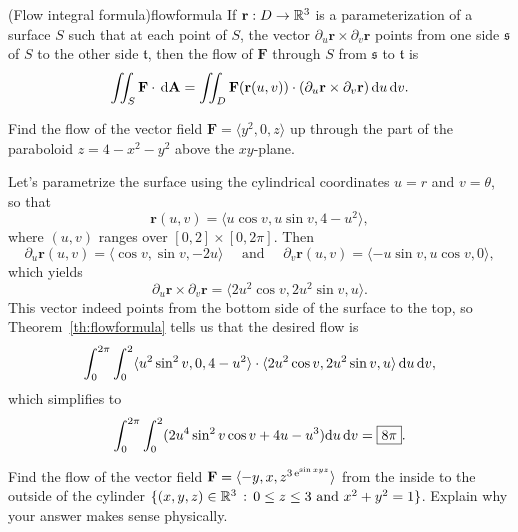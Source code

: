 \documentclass{watsonbook}
\begin{document}
\begin{theo}{(Flow integral formula)}{flowformula}
  If $\mathbf{r}:D \to \mathbb{R}^3$ is a parameterization of a surface $S$
  such that at each point of $S$, the vector
  $\partial_u \mathbf{r} \times \partial_v \mathbf{r}$ points from one
  side $\mathfrak{s}$ of $S$ to the other side $\mathfrak{t}$, then
  the flow of $\mathbf{F}$ through $S$ from $\mathfrak{s}$ to $\mathfrak{t}$ is 
  \begin{equation} \label{eq:surfformula} 
    \iint_S \mathbf{F}\cdot \, {\mathrm{d}}\mathbf{A} = \iint_D
    \mathbf{F}(\mathbf{r}(u,v)) \cdot (\partial_u
    \mathbf{r} \times \partial_v \mathbf{r}) \, {\mathrm{d}}u\,{\mathrm{d}}v. 
  \end{equation}
\end{theo}

\begin{example}{}{}
  Find the flow of the vector field $\mathbf{F} = \langle y^2, 0, z
  \rangle$ up through the part of the paraboloid $z = 4 - x^2 - y^2$
  above the $xy$-plane. 
\end{example}

\begin{solution}
  Let's parametrize the surface using the cylindrical coordinates $u=r$
  and $v=\theta$, so that
  \[
    \mathbf{r}(u,v) = \langle u\cos v, u \sin v, 4 - u^2 \rangle, 
  \]
  where $(u,v)$ ranges over $[0,2] \times [0,2\pi]$. Then 
  \[
    \partial_u \mathbf{r}(u,v) = \langle \cos v, \sin v, -2u \rangle \quad \text{ and } \quad
    \partial_v \mathbf{r}(u,v) = \langle -u\sin v, u \cos v, 0
    \rangle, 
  \]
  which yields 
  \[
    \partial_u\mathbf{r} \times \partial_v \mathbf{r} = \langle 2 u^{2} \cos v,2 u^{2} \sin v, u \rangle. 
  \]
  This vector indeed points from the bottom side of the surface to the
  top, so Theorem~\ref{th:flowformula} tells us that the desired flow
  is 
  \[
    \int_{0}^{2\pi}\int_{0}^{2} \langle u^2 \sin^2 v, 0, 4-u^2
    \rangle \cdot \langle 2 u^{2} \cos v,2 u^{2} \sin v, u \rangle \,
    \mathrm{d} u \, \mathrm{d}{v}, 
  \]
  which simplifies to
  \[
    \int_{0}^{2\pi}\int_{0}^{2} (2 u^4 \sin^2 v \cos v + 4u - u^3)
    \mathrm{d} u \, \mathrm{d}{v} = \boxed{8\pi}. 
  \]
\end{solution}

\begin{exercise}{}{}
  Find the flow of the vector field $\mathbf{F} = \langle -y, x,
  z^{3\operatorname{e}^{\sin xyz}}\rangle$
  from the inside to the outside of the cylinder $\{(x,y,z) \in \mathbb{R}^3
  \,: \, 0 \leq z \leq 3 \text{ and } x^2 + y^2 = 1\}$. Explain why
  your answer makes sense physically. 
\end{exercise}
\end{document}
